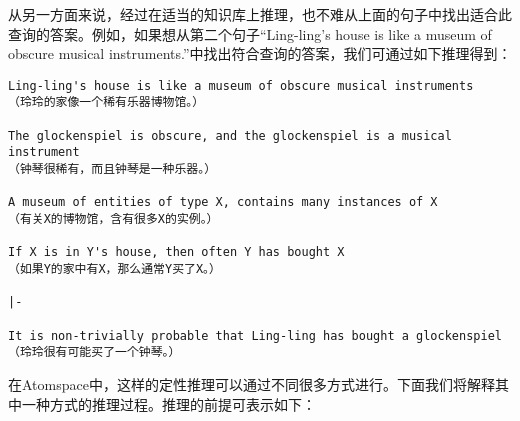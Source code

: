 从另一方面来说，经过在适当的知识库上推理，也不难从上面的句子中找出适合此查询的答案。例如，如果想从第二个句子“Ling-ling's house is like a museum of obscure musical instruments.”中找出符合查询的答案，我们可通过如下推理得到：

\begin{verbatim}
Ling-ling's house is like a museum of obscure musical instruments
（玲玲的家像一个稀有乐器博物馆。）

The glockenspiel is obscure, and the glockenspiel is a musical instrument
（钟琴很稀有，而且钟琴是一种乐器。）

A museum of entities of type X, contains many instances of X
（有关X的博物馆，含有很多X的实例。）

If X is in Y's house, then often Y has bought X
（如果Y的家中有X，那么通常Y买了X。）

|-

It is non-trivially probable that Ling-ling has bought a glockenspiel
（玲玲很有可能买了一个钟琴。）
\end{verbatim}

在Atomspace中，这样的定性推理可以通过不同很多方式进行。下面我们将解释其中一种方式的推理过程。推理的前提可表示如下：

